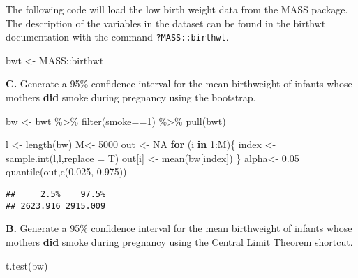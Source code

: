 \documentclass[
]{article}
\newenvironment{Shaded}{\begin{snugshade}}{\end{snugshade}}
\newcommand{\AttributeTok}[1]{\textcolor[rgb]{0.77,0.63,0.00}{#1}}
\newcommand{\ConstantTok}[1]{\textcolor[rgb]{0.00,0.00,0.00}{#1}}
\newcommand{\ControlFlowTok}[1]{\textcolor[rgb]{0.13,0.29,0.53}{\textbf{#1}}}
\newcommand{\DecValTok}[1]{\textcolor[rgb]{0.00,0.00,0.81}{#1}}
\newcommand{\FloatTok}[1]{\textcolor[rgb]{0.00,0.00,0.81}{#1}}
\newcommand{\FunctionTok}[1]{\textcolor[rgb]{0.00,0.00,0.00}{#1}}
\newcommand{\NormalTok}[1]{#1}
\newcommand{\OtherTok}[1]{\textcolor[rgb]{0.56,0.35,0.01}{#1}}
\newcommand{\SpecialCharTok}[1]{\textcolor[rgb]{0.00,0.00,0.00}{#1}}
\begin{document}
The following code will load the low birth weight data from the MASS
package. The description of the variables in the dataset can be found in
the birthwt documentation with the command \texttt{?MASS::birthwt}.

\begin{Shaded}
\begin{Highlighting}[]
\NormalTok{bwt }\OtherTok{\textless{}{-}}\NormalTok{ MASS}\SpecialCharTok{::}\NormalTok{birthwt}
\end{Highlighting}
\end{Shaded}

\textbf{C.} Generate a 95\% confidence interval for the mean birthweight
of infants whose mothers \textbf{did} smoke during pregnancy using the
bootstrap.

\begin{Shaded}
\begin{Highlighting}[]
\NormalTok{bw }\OtherTok{\textless{}{-}}\NormalTok{ bwt }\SpecialCharTok{\%\textgreater{}\%} 
  \FunctionTok{filter}\NormalTok{(smoke}\SpecialCharTok{==}\DecValTok{1}\NormalTok{) }\SpecialCharTok{\%\textgreater{}\%}
  \FunctionTok{pull}\NormalTok{(bwt)}

\NormalTok{l }\OtherTok{\textless{}{-}} \FunctionTok{length}\NormalTok{(bw)}
\NormalTok{M}\OtherTok{\textless{}{-}} \DecValTok{5000}
\NormalTok{out }\OtherTok{\textless{}{-}} \ConstantTok{NA}
\ControlFlowTok{for}\NormalTok{ (i }\ControlFlowTok{in} \DecValTok{1}\SpecialCharTok{:}\NormalTok{M)\{}
\NormalTok{  index }\OtherTok{\textless{}{-}} \FunctionTok{sample.int}\NormalTok{(l,l,}\AttributeTok{replace =}\NormalTok{ T)}
\NormalTok{  out[i] }\OtherTok{\textless{}{-}} \FunctionTok{mean}\NormalTok{(bw[index])}
\NormalTok{\}}
\NormalTok{alpha}\OtherTok{\textless{}{-}} \FloatTok{0.05}
\FunctionTok{quantile}\NormalTok{(out,}\FunctionTok{c}\NormalTok{(}\FloatTok{0.025}\NormalTok{, }\FloatTok{0.975}\NormalTok{))}
\end{Highlighting}
\end{Shaded}

\begin{verbatim}
##     2.5%    97.5% 
## 2623.916 2915.009
\end{verbatim}

\textbf{B.} Generate a 95\% confidence interval for the mean birthweight
of infants whose mothers \textbf{did} smoke during pregnancy using the
Central Limit Theorem shortcut.

\begin{Shaded}
\begin{Highlighting}[]
\FunctionTok{t.test}\NormalTok{(bw)}
\end{Highlighting}
\end{Shaded}
\end{document}
